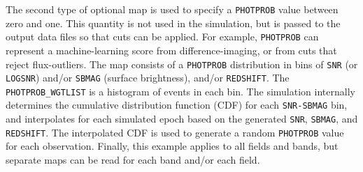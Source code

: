 \documentclass[12pt]{article}
\newcommand{\obs}{observation}
\begin{document}
{\clearpage
The second type of optional map is used to specify a {\tt PHOTPROB}
value between zero and one. This quantity is not used in the simulation,
but is passed to the output data files so that cuts can be applied.
For example, {\tt PHOTPROB} can represent a machine-learning score 
from difference-imaging, or from cuts that reject flux-outliers.
The map consists of a {\tt PHOTPROB} distribution  in bins
of {\tt SNR} (or {\tt LOGSNR}) and/or {\tt SBMAG} (surface brightness),
and/or {\tt REDSHIFT}.
The {\tt PHOTPROB\_WGTLIST} is a histogram of events in each bin.
The simulation internally determines the cumulative distribution
function (CDF) for each {\tt SNR-SBMAG} bin, and interpolates
for each simulated epoch based on the generated 
{\tt SNR}, {\tt SBMAG}, and {\tt REDSHIFT}.
The interpolated CDF is used to generate a random {\tt PHOTPROB} value
for each \obs. Finally, this example applies to all fields and bands,
but separate maps can be read for each band and/or each field.

\newcommand{\NPHOTPROB}{N_{\rm PhotProb}}
\newcommand{\UNIRAN}{U[0,1]}

}
\end{document}

